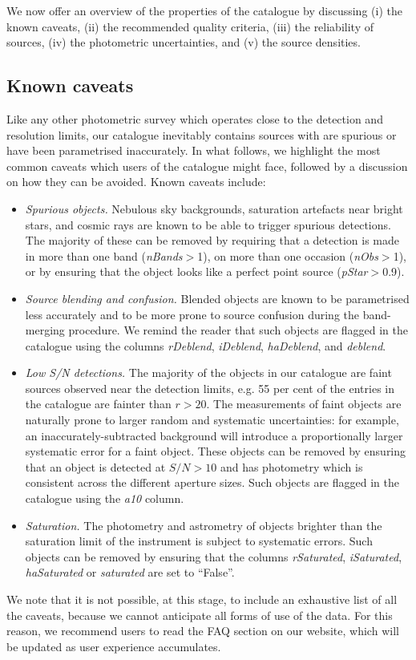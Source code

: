 \documentclass[a4paper,useAMS,usenatbib]{mn2e}
\begin{document}
{\bf

We now offer an overview of the properties of the
catalogue by discussing 
(i) the known caveats,
(ii) the recommended quality criteria,
(iii) the reliability of sources,
(iv) the photometric uncertainties,
and (v) the source densities.

\subsection{Known caveats}

Like any other photometric survey
which operates close
to the detection and resolution limits,
our catalogue inevitably contains sources
with are spurious or have been parametrised inaccurately.
In what follows, we highlight the most common
caveats which users of the catalogue might face,
followed by a discussion on how they can be avoided.
Known caveats include:
\begin{itemize}
\item \emph{Spurious objects.}
Nebulous sky backgrounds,
saturation artefacts near bright stars,
and cosmic rays
are known to be able to trigger spurious detections.
The majority of these can be removed by requiring
that a detection is made in more than one band
(\emph{nBands}$>$1),
on more than one occasion (\emph{nObs}$>$1),
or by ensuring that the object looks like a perfect
point source (\emph{pStar}$>$0.9).
\item \emph{Source blending and confusion.}
Blended objects are known to be parametrised less accurately
and to be more prone 
to source confusion
during the band-merging procedure.
We remind the reader that such objects are flagged in the catalogue
using the columns \emph{rDeblend}, \emph{iDeblend},
\emph{haDeblend}, and \emph{deblend}.
\item \emph{Low S/N detections.}
The majority of the objects in our catalogue
are faint sources observed near the detection limits,
e.g. 55 per cent of the entries in the catalogue
are fainter than $r > 20$.
The measurements of faint objects
are naturally prone to larger
random and systematic uncertainties:
for example, an inaccurately-subtracted background
will introduce a proportionally larger systematic error
for a faint object.
These objects can be removed by ensuring that an
object is detected at $S/N>10$
and has photometry which is consistent across
the different aperture sizes.
Such objects are flagged in the catalogue
using the \emph{a10} column.
\item \emph{Saturation.}
The photometry and astrometry of objects
brighter than the saturation limit of the instrument
is subject to systematic errors.
Such objects can be removed by ensuring that the columns
\emph{rSaturated}, \emph{iSaturated}, \emph{haSaturated}
or \emph{saturated} are set to ``False''.
\end{itemize}
We note that it is not possible, at this stage,
to include an exhaustive list of all the caveats,
because we cannot anticipate all forms of use of the data.
For this reason, we recommend users to read
the FAQ section on our website,
which will be updated as user experience accumulates.


}
\end{document}
